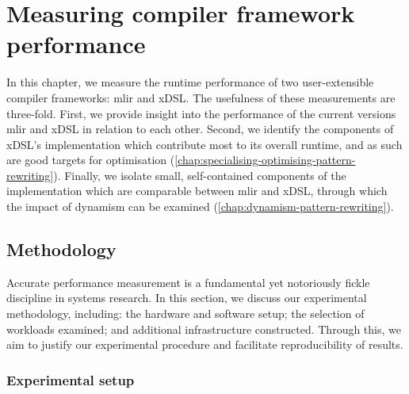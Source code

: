 \chapter{Measuring compiler framework performance}
\label{chap:measuring-compiler-performance}

In this chapter, we measure the runtime performance of two user-extensible compiler frameworks: \ac{mlir} and xDSL.
The usefulness of these measurements are three-fold. First, we provide insight into the performance of the current versions \ac{mlir} and xDSL in relation to each other. %
Second, we identify the components of xDSL's implementation which contribute most to its overall runtime, and as such are good targets for optimisation (\autoref{chap:specialising-optimising-pattern-rewriting}).
Finally, we isolate small, self-contained components of the implementation which are comparable between \ac{mlir} and xDSL, through which the impact of dynamism can be examined (\autoref{chap:dynamism-pattern-rewriting}).



\section{Methodology}
\label{sec:methodology}

Accurate performance measurement is a fundamental yet notoriously fickle discipline in systems research.
In this section, we discuss our experimental methodology, including: the hardware and software setup; the selection of workloads examined; and additional infrastructure constructed.
Through this, we aim to justify our experimental procedure and facilitate reproducibility of results.

\subsection{Experimental setup}
\label{ssec:experimental-setup}

